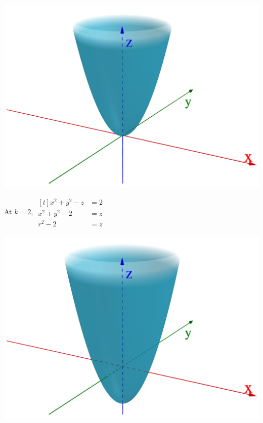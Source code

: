 \documentclass[11pt,fleqn]{book} %
\begin{document}
\begin{enumerate}
\begin{minipage}[t]{0.45\linewidth}
        \begin{center} \includegraphics[width=\linewidth]{Plots/e_1_7/1.png} \end{center}
    \end{minipage}
    \begin{minipage}[t]{0.45\linewidth}
        At $k = 2$, 
        $\begin{aligned}[t]
            x^2 + y^2 - z &= 2 \\
            x^2 + y^2 - 2 &= z \\
            r^2 - 2       &= z
        \end{aligned}$

        \begin{center} \includegraphics[width=\linewidth]{Plots/e_1_7/2.png} \end{center}
    \end{minipage}
\end{enumerate}
\end{document}
